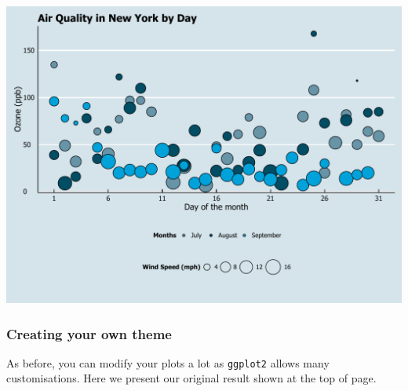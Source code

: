 \documentclass[]{article}
\begin{document}
\begin{center}\includegraphics{0_all_posts_pdf/wscatter_19-1} \end{center}

\subsubsection{Creating your own theme}\label{creating-your-own-theme-5}

As before, you can modify your plots a lot as \texttt{ggplot2} allows
many customisations. Here we present our original result shown at the
top of page.
\end{document}
